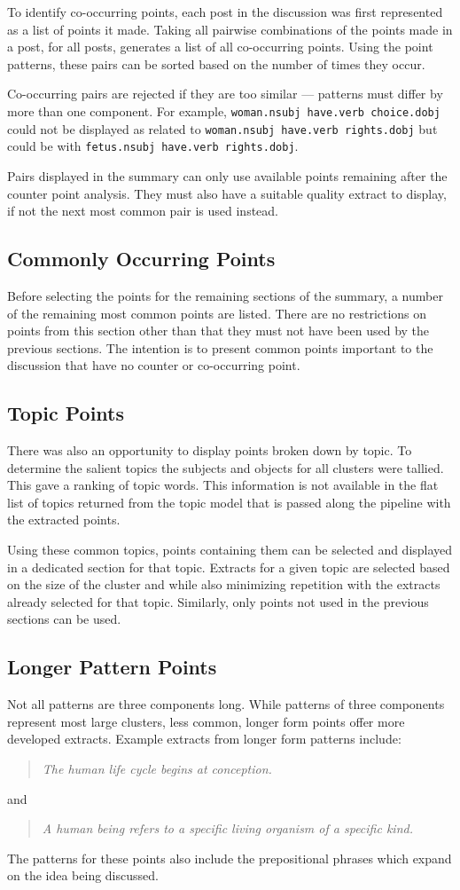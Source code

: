       To identify co-occurring points, each post in the discussion was first represented as a list of points it made. Taking all pairwise combinations of the points made in a post, for all posts, generates a list of all co-occurring points. Using the point patterns, these pairs can be sorted based on the number of times they occur.

      Co-occurring pairs are rejected if they are too similar --- patterns must differ by more than one component. For example, \texttt{woman.nsubj have.verb choice.dobj} could not be displayed as related to \texttt{woman.nsubj have.verb rights.dobj} but could be with \texttt{fetus.nsubj have.verb rights.dobj}.

      Pairs displayed in the summary can only use available points remaining after the counter point analysis. They must also have a suitable quality extract to display, if not the next most common pair is used instead.
    \subsection{Commonly Occurring Points}
      Before selecting the points for the remaining sections of the summary, a number of the remaining most common points are listed. There are no restrictions on points from this section other than that they must not have been used by the previous sections. The intention is to present common points important to the discussion that have no counter or co-occurring point.

    \subsection{Topic Points}
      There was also an opportunity to display points broken down by topic. To determine the salient topics the subjects and objects for all clusters were tallied. This gave a ranking of topic words. This information is not available in the flat list of topics returned from the topic model that is passed along the pipeline with the extracted points.

      Using these common topics, points containing them can be selected and displayed in a dedicated section for that topic. Extracts for a given topic are selected based on the size of the cluster and while also minimizing repetition with the extracts already selected for that topic. Similarly, only points not used in the previous sections can be used.

    \subsection{Longer Pattern Points}
    Not all patterns are three components long. While patterns of three components represent most large clusters, less common, longer form points offer more developed extracts. Example extracts from longer form patterns include: \blockquote{\textit{The human life cycle begins at conception.}} and \blockquote{\textit{A human being refers to a specific living organism of a specific kind.}}. The patterns for these points also include the prepositional phrases which expand on the idea being discussed.

